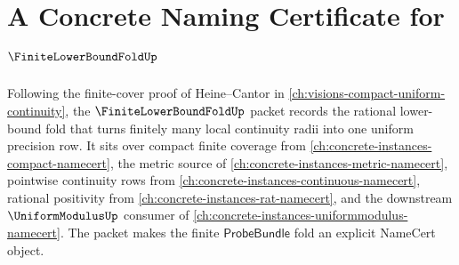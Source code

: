 \chapter{A Concrete Naming Certificate for $\FiniteLowerBoundFoldUp$}
\label{ch:concrete-instances-finite-lower-bound-fold-namecert}

Following the finite-cover proof of Heine--Cantor in \autoref{ch:visions-compact-uniform-continuity}, the $\FiniteLowerBoundFoldUp$ packet records the rational lower-bound fold that turns finitely many local continuity radii into one uniform precision row. It sits over compact finite coverage from \autoref{ch:concrete-instances-compact-namecert}, the metric source of \autoref{ch:concrete-instances-metric-namecert}, pointwise continuity rows from \autoref{ch:concrete-instances-continuous-namecert}, rational positivity from \autoref{ch:concrete-instances-rat-namecert}, and the downstream $\UniformModulusUp$ consumer of \autoref{ch:concrete-instances-uniformmodulus-namecert}. The packet makes the finite $\mathsf{ProbeBundle}$ fold an explicit NameCert object.

